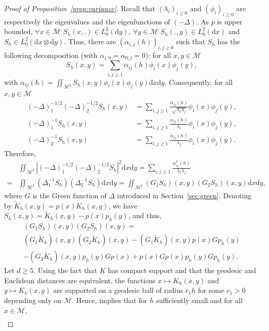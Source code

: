 \documentclass[10pt,a4paper]{article}
\newcommand\cM{\mathcal{M}}
\newcommand\dd{\mathrm{d}}
\newcommand{\ABS}[1]{{{\left| #1 \right|}}} %
\newcommand{\PAR}[1]{{{\left(#1\right)}}} %
\begin{document}
\begin{proof}[Proof of Proposition~\ref{prop:variance}]
 Recall that $(\lambda_i)_{i\ge0}$ and $(\phi_i)_{i\ge 0}$ are respectively the eigenvalues and the eigenfunctions of $(-\Delta)$. As $p$ is upper bounded, $\forall x\in\cM$ $S_h(x,.) \in L_0^2( \dd y)$, $\forall y\in\cM$ $S_h(.,y) \in L_0^2( \dd x)$ and $S_h \in L_0^2( \dd x \otimes \dd y)$. Thus, there are $(\alpha_{i,j}(h) )_{i,j \ge 0}$ such that  $S_h$ has the following decomposition (with $\alpha_{i,0}=\alpha_{0,j}=0$): for all $x,y\in \cM$
 $$S_h(x,y) = \sum_{i,j \ge 1} \alpha_{ij}(h) \phi_i(x) \phi_j(y),$$
with $\alpha_{ij}(h)=\iint_{\cM^2} S_h(x,y)\phi_i(x)\phi_j(y)\dd x\dd y$. Consequently, for all $x,y\in \cM$
 \begin{align*}
 	\PAR{-\Delta}_1^{-1/2}\PAR{-\Delta}_2^{-1/2} S_h (x,y)&=  \sum_{i,j \ge 1} \frac{\alpha_{ij}(h)}{\sqrt{\lambda_i \lambda_j}} \phi_i(x) \phi_j(y), \\
 	\PAR{-\Delta}_1^{-1} S_h(x,y) & =  \sum_{i,j \ge 1} \frac{\alpha_{ij}(h)}{\lambda_i } \phi_i(x) \phi_j(y), \\
 	 	\PAR{-\Delta}_2^{-1} S_h(x,y) & =  \sum_{i,j \ge 1} \frac{\alpha_{ij}(h)}{\lambda_j } \phi_i(x) \phi_j(y). 
 \end{align*}
 Therefore,
 \begin{align*}
 	&\iint_{\cM^2}\ABS{\PAR{-\Delta}_1^{-1/2}\PAR{-\Delta}_2^{-1/2} S_h }^2\dd x  \dd y = \sum_{i,j \ge 1} \frac{\alpha_{ij}^2(h)}{\lambda_i \lambda_j}  \\ 	
 	=& \iint_{\cM^2}(\Delta_1^{-1}S_h)(\Delta_2^{-1} S_h) \dd x  \dd y = \iint_{\cM^2}(G_1S_h)(x,y)(G_2S_h)(x,y) \dd x  \dd y,
 \end{align*}
where $G$ is the Green function of $\Delta$ introduced in Section~\ref{sec:green}.
	{Denoting by $\widetilde{K}_h(x,y)=p(x)K_h(x,y)$, we have $S_h(x,y)=\widetilde{K}_h(x,y)- p(x)p_h(y)$, and thus, 
\begin{multline}\label{eq:G1SG2S}
(G_1S_h)(x,y)(G_2S_h)(x,y)=\\
(G_1\widetilde{K}_h)(x,y)(G_2\widetilde{K}_h)(x,y)-(G_1\widetilde{K}_h)(x,y)p(x)Gp_h(y)\\
-(G_2\widetilde{K}_h)(x,y)p_h(y)Gp(x)
+p(x)Gp(x)p_h(y)Gp_h(y).
\end{multline}}
Let $d\ge 5$. Using the fact that $K$ has compact support and that the geodesic and Euclidean distances are equivalent, the functions $x\mapsto K_h(x,y)$ and $y\mapsto K_h(x,y)$ are supported on a geodesic ball of radius $c_1h$ for some $c_1>0$ depending only on $\cM$. Hence,   implies that for $h$ sufficiently small and  for all $x\in\cM$,
	\begin{align}

\end{align}
\end{proof}
\end{document}
